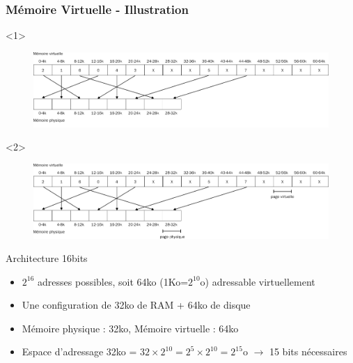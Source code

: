 \documentclass[8pt]{beamer}
\begin{document}
\begin{frame}[c]
    \frametitle{Mémoire Virtuelle - Illustration}
    \begin{onlyenv}<1>
        \vspace*{1.25cm}
        \begin{figure}
            \centering

            \includegraphics[height=.25\textwidth]{figures/memoire_virtuelle_physique_sans_page.pdf}
        \end{figure}
    \end{onlyenv}
    \begin{onlyenv}<2>
        \vspace*{1.25cm}
        \begin{figure}
            \centering

            \includegraphics[height=.25\textwidth]{figures/memoire_virtuelle_physique.pdf}
        \end{figure}
    \end{onlyenv}

    \begin{exampleblock}{Architecture 16bits}
        \begin{itemize}
            \item  $2^{16}$ adresses possibles, soit 64ko
                  (1Ko=$2^{10}$o) adressable virtuellement
            \item Une configuration de 32ko de RAM + 64ko de disque
            \item M\'emoire physique : 32ko, M\'emoire virtuelle : 64ko
            \item Espace d'adressage 32ko = $32 \times 2^{10} = 2^5
                      \times2^{10} = 2^{15}$o $\to$ 15 bits n\'ecessaires
        \end{itemize}
    \end{exampleblock}
\end{frame}
\end{document}
